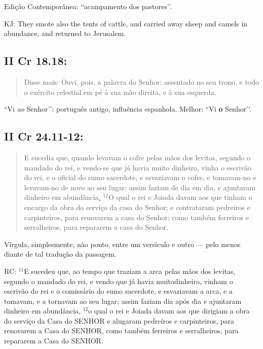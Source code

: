 Edição Contemporânea: ``acampamento dos pastores’’.

KJ: They smote also the tents of cattle, and carried away sheep and camels in abundance, and returned to Jerusalem.

\subsection*{II Cr 18.18:} 
\begin{quote}
    \small
Disse mais: Ouvi, pois, a palavra do Senhor:   assentado no seu trono, e todo o exército  celestial em pé à sua mão direita, e à sua esquerda.
\end{quote}
 
``Vi \emph{ao} Senhor’’: português antigo, influência  espanhola. Melhor: ``Vi \textbf{o} Senhor’’.

\subsection*{II Cr 24.11-12:} 
\begin{quote}
    \small
E sucedia que, quando levavam o cofre pelas mãos dos levitas, segundo o mandado do rei, e vendo-se que já havia muito dinheiro, vinha o escrivão do rei, e o oficial do sumo sacerdote, e esvaziavam o cofre, e tomavam-no e levavam-no de novo ao seu lugar; assim faziam de dia em dia, e ajuntaram dinheiro em abundância\uline{.} $^{\mathrm{12}}$O qual o rei e Joiada davam aos que tinham o encargo da obra do serviço da casa do Senhor; e contrataram pedreiros e carpinteiros, para renovarem a casa do Senhor; como também ferreiros e serralheiros, para repararem a casa do Senhor.
 \end{quote}
 
Vírgula, simplesmente, não ponto, entre um versículo e outro --- pelo menos diante de tal tradução da passagem.

RC: $^{\mathrm{11}}$E sucedeu que, ao tempo que traziam a arca pelas mãos dos levitas, segundo o mandado do rei, e vendo que já havia muitodinheiro, vinham o escrivão do rei e o comissário do sumo sacerdote, e esvaziavam a arca, e a tomavam, e a tornavam ao seu lugar; assim faziam dia após dia e ajuntaram dinheiro em abundância, $^{\mathrm{12}}$o qual o rei e Joiada davam aos que dirigiam a obra do
serviço da Casa do SENHOR e alugaram pedreiros e carpinteiros, para renovarem a Casa do SENHOR, como também ferreiros e serralheiros, para repararem a Casa do SENHOR.

